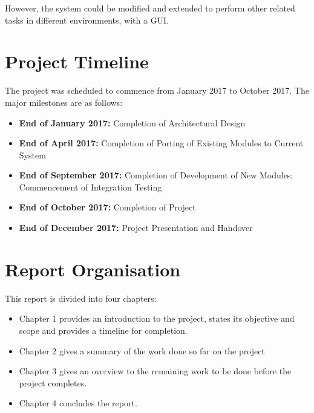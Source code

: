 However, the system could be modified and extended to perform other related tasks
in different environments, with a GUI\@.

\section{Project Timeline}

The project was scheduled to commence from January 2017 to October 2017. The major
milestones are as follows:

\begin{itemize}
    \item \textbf{End of January 2017:} Completion of Architectural Design
    \item \textbf{End of April 2017:} Completion of Porting of Existing Modules
    to Current System
    \item \textbf{End of September 2017:} Completion of Development of New Modules;
    Commencement of Integration Testing
    \item \textbf{End of October 2017:} Completion of Project
    \item \textbf{End of December 2017:} Project Presentation and Handover
\end{itemize}

\section{Report Organisation}

This report is divided into four chapters:

\begin{itemize}
    \item Chapter 1 provides an introduction to the project, states its objective
    and scope and provides a timeline for completion.
    \item Chapter 2 gives a summary of the work done so far on the project
    \item Chapter 3 gives an overview to the remaining work to be done before the
    project completes.
    \item Chapter 4 concludes the report.
\end{itemize}